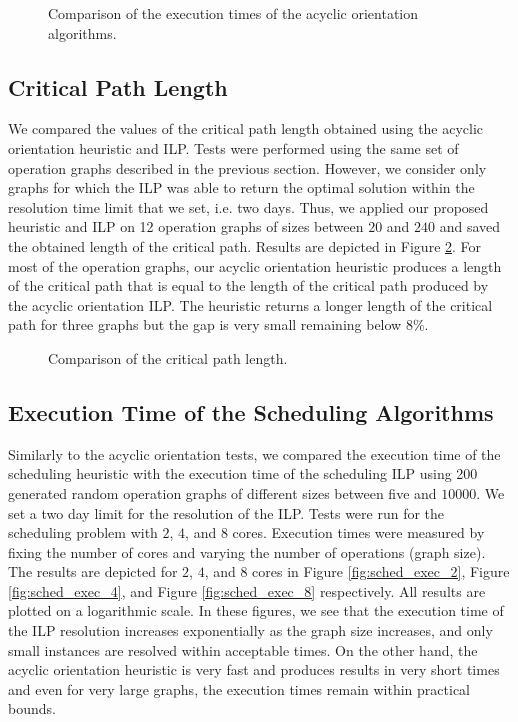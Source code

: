 \begin{figure}[phbt]
\centering

\caption{Comparison of the execution times of the acyclic orientation algorithms.}
\label{fig:orient_exec}
\end{figure} 
 
\subsection{Critical Path Length}

We compared the values of the critical path length obtained using the acyclic orientation heuristic and ILP. Tests were performed using the same set of operation graphs described in the previous section. However, we consider only graphs for which the ILP was able to return the optimal solution within the resolution time limit that we set, i.e. two days. Thus, we applied our proposed heuristic and ILP on 12 operation graphs of sizes between $20$ and $240$ and saved the obtained length of the critical path. Results are depicted in Figure \ref{fig:orient_critpath}. For most of the operation graphs, our acyclic orientation heuristic produces a length of the critical path that is equal to the length of the critical path produced by the acyclic orientation ILP. The heuristic returns a longer length of the critical path for three graphs but the gap is very small remaining below $8\%$.  

\begin{figure}[phbt]
\centering

\caption{Comparison of the critical path length.}
\label{fig:orient_critpath}
\end{figure}

\subsection{Execution Time of the Scheduling Algorithms}

Similarly to the acyclic orientation tests, we compared the execution time of the scheduling heuristic with the execution time of the scheduling ILP using 200 generated random operation graphs of different sizes between five and $10000$. We set a two day limit for the resolution of the ILP. Tests were run for the scheduling problem with $2$, $4$, and $8$ cores. Execution times were measured by fixing the number of cores and varying the number of operations (graph size). The results are depicted for $2$, $4$, and $8$ cores in Figure \ref{fig:sched_exec_2}, Figure \ref{fig:sched_exec_4}, and Figure \ref{fig:sched_exec_8} respectively. All results are plotted on a logarithmic scale. In these figures, we see that the execution time of the ILP resolution increases exponentially as the graph size increases, and only small instances are resolved within acceptable times. On the other hand, the acyclic orientation heuristic is very fast and produces results in very short times and even for very large graphs, the execution times remain within practical bounds.

